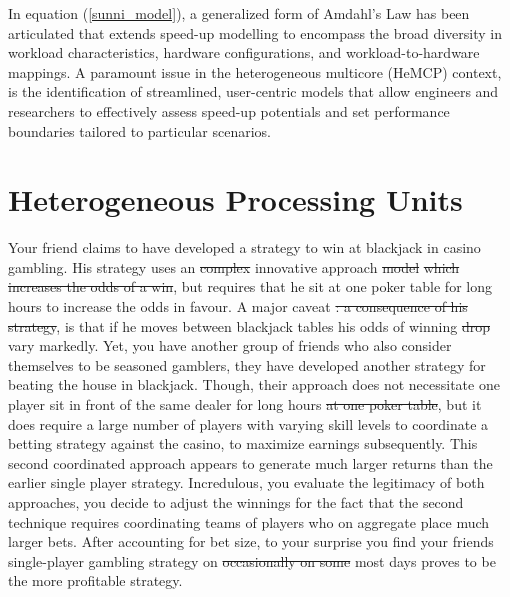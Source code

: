 \documentclass[10pt]{article}[draft]
\begin{document}
In equation (\ref{sunni_model}), a generalized form of Amdahl's Law has been articulated that extends speed-up modelling to encompass the broad diversity in workload characteristics, hardware configurations, and workload-to-hardware mappings. A paramount issue in the heterogeneous multicore (HeMCP) context, is the identification of streamlined, user-centric models that allow engineers and researchers to effectively assess speed-up potentials and set performance boundaries tailored to particular scenarios.



\section{Heterogeneous Processing Units}
		
Your friend claims to have developed a strategy to win at blackjack in casino gambling. His strategy uses an \st{complex} innovative approach \st{model} \st{which increases the odds of a win}, but requires that he sit at one poker table for long hours to increase the odds in favour. A major caveat \st{: a consequence of his strategy}, is that if he moves  between blackjack tables his odds of winning \st{drop} vary markedly. Yet, you have another group of friends who also consider themselves to be seasoned gamblers, they have developed another strategy for beating the house in blackjack. Though, their approach does not necessitate one player sit in front of the same dealer for long hours \st{at one poker table}, but it does require a large number of players with varying skill levels to coordinate a betting strategy against the casino, to maximize earnings subsequently. This second coordinated approach  appears to generate much larger returns than the earlier single player strategy. Incredulous, you evaluate the legitimacy of both approaches, {you decide to} adjust the winnings for the fact that the second technique requires coordinating teams of players who on aggregate place much larger bets. After accounting for  bet size, to your surprise you find your friends single-player gambling strategy on \st{occasionally on some} most days proves to be the more profitable strategy. 
\end{document}

